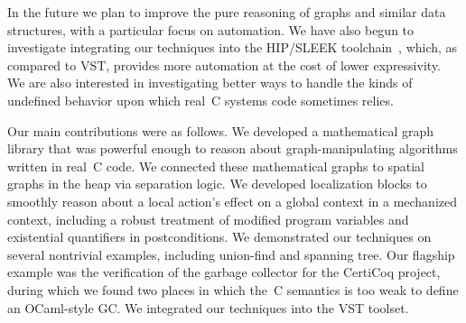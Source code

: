 In the future we plan to improve the pure reasoning of graphs and
similar data structures, with a particular focus on automation.  We have
also begun to investigate integrating our techniques into the 
HIP/SLEEK toolchain~\cite{chin:hipsleek}, which, as compared to VST, 
provides more automation at the cost of lower expressivity.  We
are also interested in investigating better ways to handle the
kinds of undefined behavior upon which real~C systems code sometimes
relies.


Our main contributions were as follows.  We developed a mathematical
graph library that was powerful enough to reason about graph-manipulating
algorithms written in real~C code.  We connected these mathematical graphs
to spatial graphs in the heap via separation logic.  We developed 
localization blocks to smoothly reason about a local action's effect on
a global context in a mechanized context, including a robust treatment
of modified program variables and existential quantifiers in postconditions.
We demonstrated our techniques on several nontrivial examples, including union-find
and spanning tree.  Our flagship example was the verification of the garbage collector 
for the CertiCoq project, during which we found two places in which the~C semantics
is too weak to define an OCaml-style GC.  We integrated our techniques into the
VST toolset. %

